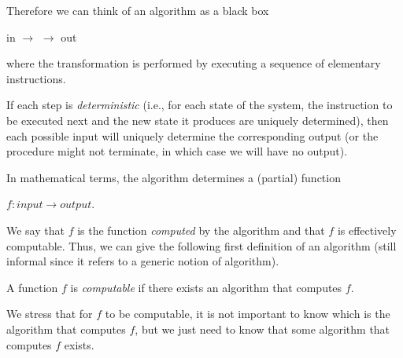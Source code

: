 Therefore we can think of an algorithm as a black box
\begin{center}
  in $\rightarrow$  $\rightarrow$ out
\end{center}
where the transformation is performed by executing a sequence of
elementary instructions.

If each step is \emph{deterministic} (i.e., for each state of the
system, the instruction to be executed next and the new state it produces are
uniquely determined), then each possible input will uniquely determine
the corresponding output (or the procedure might not terminate, in which case we will have no output).

In mathematical terms, the algorithm determines a (partial) function

\begin{center}
  $f : \mathit{input} \rightarrow \mathit{output}$.
\end{center}

We say that $f$ is the function \emph{computed} by the algorithm and
that $f$ is effectively computable. Thus, we can give the following
first definition of an algorithm (still informal since it refers to a
generic notion of algorithm).

\begin{definition}
  A function $f$ is \emph{computable} if there exists an algorithm
  that computes $f$.
\end{definition}

We stress that for $f$ to be computable, it is not important to know which is the algorithm that computes $f$, but we just need to know that some algorithm that computes $f$ exists.

